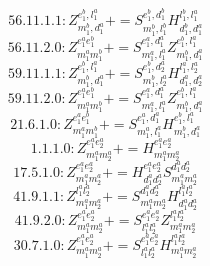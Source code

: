 \documentclass[letterpaper,10pt,fleqn,leqno,onecolumn]{article}
\begin{document}
\begin{equation} \;\;\;\;\;\;  56.11.1.1: Z^{e_{1}^{b},l_{1}^{a}}_{m_{1}^{b},d_{1}^{a}}+=S^{e_{1}^{b},d_{1}^{b}}_{m_{1}^{b},l_{1}^{b}}H^{l_{1}^{b},l_{1}^{a}}_{d_{1}^{b},d_{1}^{a}} \end{equation}
\begin{equation} \;\;\;\;\;\;  56.11.2.0: Z^{e_{1}^{a}e_{1}^{b}}_{m_{1}^{a}m_{1}^{b}}+=S^{e_{1}^{a},d_{1}^{a}}_{m_{1}^{a},l_{1}^{a}}Z^{e_{1}^{b},l_{1}^{a}}_{m_{1}^{b},d_{1}^{a}} \end{equation}
\begin{equation} \;\;\;\;\;\;  59.11.1.1: Z^{e_{1}^{b},l_{1}^{a}}_{m_{1}^{b},d_{1}^{a}}+=S^{e_{1}^{b},d_{2}^{a}}_{m_{1}^{b},l_{2}^{a}}H^{l_{1}^{a},l_{2}^{a}}_{d_{1}^{a},d_{2}^{a}} \end{equation}
\begin{equation} \;\;\;\;\;\;  59.11.2.0: Z^{e_{1}^{a}e_{1}^{b}}_{m_{1}^{a}m_{1}^{b}}+=S^{e_{1}^{a},d_{1}^{a}}_{m_{1}^{a},l_{1}^{a}}Z^{e_{1}^{b},l_{1}^{a}}_{m_{1}^{b},d_{1}^{a}} \end{equation}
\begin{equation} \;\;\;\;\;\;  21.6.1.0: Z^{e_{1}^{a}e_{1}^{b}}_{m_{1}^{a}m_{1}^{b}}+=S^{e_{1}^{a},d_{1}^{a}}_{m_{1}^{a},l_{1}^{a}}H^{e_{1}^{b},l_{1}^{a}}_{m_{1}^{b},d_{1}^{a}} \end{equation}
\begin{equation} \;\;\;\;\;\;  1.1.1.0: Z^{e_{1}^{a}e_{2}^{a}}_{m_{1}^{a}m_{2}^{a}}+=H^{e_{1}^{a}e_{2}^{a}}_{m_{1}^{a}m_{2}^{a}} \end{equation}
\begin{equation} \;\;\;\;\;\;  17.5.1.0: Z^{e_{1}^{a}e_{2}^{a}}_{m_{1}^{a}m_{2}^{a}}+=H^{e_{1}^{a}e_{2}^{a}}_{d_{1}^{a}d_{2}^{a}}S^{d_{1}^{a}d_{2}^{a}}_{m_{1}^{a}m_{2}^{a}} \end{equation}
\begin{equation} \;\;\;\;\;\;  41.9.1.1: Z^{l_{1}^{a}l_{2}^{a}}_{m_{1}^{a}m_{2}^{a}}+=S^{d_{1}^{a}d_{2}^{a}}_{m_{1}^{a}m_{2}^{a}}H^{l_{1}^{a}l_{2}^{a}}_{d_{1}^{a}d_{2}^{a}} \end{equation}
\begin{equation} \;\;\;\;\;\;  41.9.2.0: Z^{e_{1}^{a}e_{2}^{a}}_{m_{1}^{a}m_{2}^{a}}+=S^{e_{1}^{a}e_{2}^{a}}_{l_{1}^{a}l_{2}^{a}}Z^{l_{1}^{a}l_{2}^{a}}_{m_{1}^{a}m_{2}^{a}} \end{equation}
\begin{equation} \;\;\;\;\;\;  30.7.1.0: Z^{e_{1}^{a}e_{2}^{a}}_{m_{1}^{a}m_{2}^{a}}+=S^{e_{1}^{a}e_{2}^{a}}_{l_{1}^{a}l_{2}^{a}}H^{l_{1}^{a}l_{2}^{a}}_{m_{1}^{a}m_{2}^{a}} \end{equation}
\end{document}

